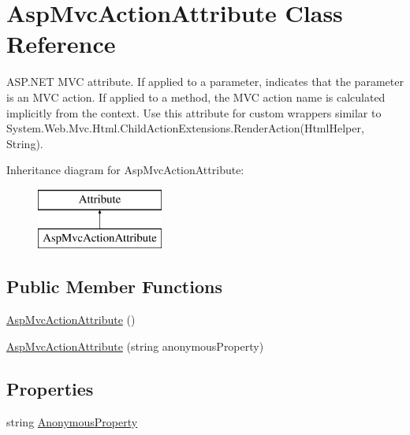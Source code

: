 \hypertarget{class_asp_mvc_action_attribute}{}\section{Asp\+Mvc\+Action\+Attribute Class Reference}
\label{class_asp_mvc_action_attribute}


A\+S\+P.\+N\+E\+T M\+V\+C attribute. If applied to a parameter, indicates that the parameter is an M\+V\+C action. If applied to a method, the M\+V\+C action name is calculated implicitly from the context. Use this attribute for custom wrappers similar to {\ttfamily System.\+Web.\+Mvc.\+Html.\+Child\+Action\+Extensions.\+Render\+Action(\+Html\+Helper, String)}.  


Inheritance diagram for Asp\+Mvc\+Action\+Attribute\+:\begin{figure}[H]
\begin{center}
\leavevmode
\includegraphics[height=2.000000cm]{class_asp_mvc_action_attribute}
\end{center}
\end{figure}
\subsection*{Public Member Functions}
\begin{DoxyCompactItemize}
\item 
\hyperlink{class_asp_mvc_action_attribute_a252bc1d3d3db3cae55317ccccbfb0923}{Asp\+Mvc\+Action\+Attribute} ()
\item 
\hyperlink{class_asp_mvc_action_attribute_a2f39095bf0a497897fbbc76e96621ff0}{Asp\+Mvc\+Action\+Attribute} (string anonymous\+Property)
\end{DoxyCompactItemize}
\subsection*{Properties}
\begin{DoxyCompactItemize}
\item 
string \hyperlink{class_asp_mvc_action_attribute_a7068fa64becd1bc3de4622e5a50b0a49}{Anonymous\+Property}
\end{DoxyCompactItemize}


